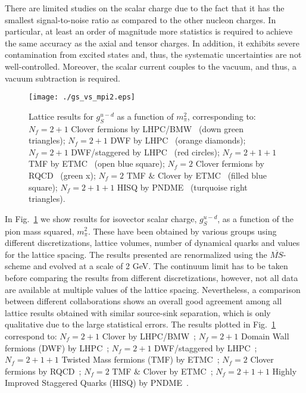 \documentclass[epj]{webofc}
\newcommand{\cl}{\centerline}
\begin{document}
There are limited studies on the scalar charge due to the fact that it has the smallest signal-to-noise ratio as
compared to the other nucleon charges. In particular, at least an order of magnitude more statistics is required
to achieve the same accuracy as the axial and tensor charges. In addition, it exhibits severe contamination from 
excited states and, thus, the systematic uncertainties are not well-controlled. Moreover, the scalar current couples 
to the vacuum, and thus, a vacuum subtraction is required. 
\begin{figure}[h]
\cl{\texttt{[image: ./gs\_vs\_mpi2.eps]}}
\caption{Lattice results for $g^{u-d}_S$ as a function of $m_\pi^2$, corresponding to: 
$N_f{=}2{+}1$ Clover fermions by LHPC/BMW~\cite{Green:2012ej} (down green triangles);
$N_f{=}2{+}1$ DWF by LHPC~\cite{Green:2012ej} (orange diamonds);
$N_f{=}2{+}1$  DWF/staggered by LHPC~\cite{Green:2012ej} (red circles);
$N_f{=}2{+}1{+}1$ TMF by ETMC~\cite{Alexandrou:2013jsa} (open blue square);
$N_f{=}2$ Clover fermions by RQCD~\cite{Bali:2014nma} (green x);
$N_f{=}2$ TMF $\&$ Clover by ETMC~\cite{Abdel-Rehim:2015owa} (filled blue square);
$N_f{=}2{+}1{+}1$ HISQ by PNDME~\cite{Bhattacharya:2016zcn} (turquoise right triangles).} 
\label{fig_gS}
\end{figure}
\FloatBarrier
In Fig.~\ref{fig_gS} we show results for isovector scalar charge, $g^{u-d}_S$, as a function of the pion mass squared, $m_\pi^2$. These have been obtained by 
various groups using different discretizations, lattice volumes, number of dynamical quarks and values for the lattice 
spacing. The results presented are renormalized using the $\overline{MS}$-scheme and evolved at a scale of 2 GeV.
The continuum limit has to be taken before comparing the results from different discretizations, however, not all data are available at
multiple values of the lattice spacing. Nevertheless, a comparison between different collaborations shows an overall good agreement among all 
lattice results obtained with similar source-sink separation, which is only qualitative due to the large statistical errors. The results plotted in Fig.~\ref{fig_gS} 
correspond to: 
$N_f{=}2{+}1$ Clover by LHPC/BMW~\cite{Green:2012ej};
$N_f{=}2{+}1$ Domain Wall fermions (DWF) by LHPC~\cite{Green:2012ej};
$N_f{=}2{+}1$  DWF/staggered by LHPC~\cite{Green:2012ej};
$N_f{=}2{+}1{+}1$ Twisted Mass fermions (TMF) by ETMC~\cite{Alexandrou:2013jsa};
$N_f{=}2$ Clover fermions by RQCD~\cite{Bali:2014nma};
$N_f{=}2$ TMF $\&$ Clover by ETMC~\cite{Abdel-Rehim:2015owa};
$N_f{=}2{+}1{+}1$ Highly Improved Staggered Quarks (HISQ) by PNDME~\cite{Bhattacharya:2016zcn}.
\end{document}
